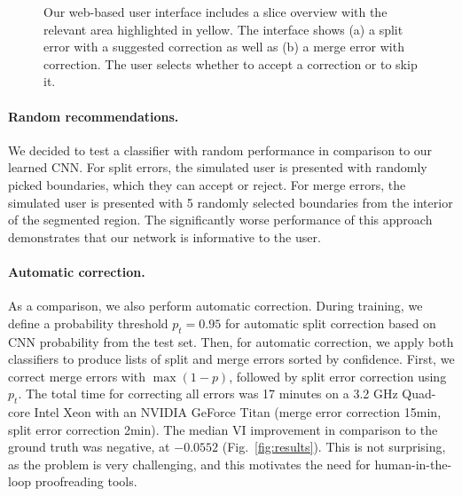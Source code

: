 \begin{figure}
 \centering
    \hfill
	\caption{Our web-based user interface includes a slice overview with the relevant area highlighted in yellow. The interface shows (a) a split error with a suggested correction as well as (b) a merge error with correction. The user selects whether to accept a correction or to skip it.}
	\vspace{-0.4cm}
\end{figure}

\paragraph{Random recommendations.} We decided to test a classifier with random performance in comparison to our learned CNN. For split errors, the simulated user is presented with randomly picked boundaries, which they can accept or reject. For merge errors, the simulated user is presented with 5 randomly selected boundaries from the interior of the segmented region. The significantly worse performance of this approach demonstrates that our network is informative to the user.

\paragraph{Automatic correction.} As a comparison, we also perform automatic correction. During training, we define a probability threshold $p_t=0.95$ for automatic split correction based on CNN probability from the test set. Then, for automatic correction, we apply both classifiers to produce lists of split and merge errors sorted by confidence. First, we correct merge errors with $\max(1-p)$, followed by split error correction using $p_t$. The total time for correcting all errors was 17 minutes on a 3.2 GHz Quad-core Intel Xeon with an NVIDIA GeForce Titan (merge error correction 15min, split error correction 2min). The median VI improvement in comparison to the ground truth was negative, at $-0.0552$ (Fig.~\ref{fig:results}). This is not surprising, as the problem is very challenging, and this motivates the need for human-in-the-loop proofreading tools.


